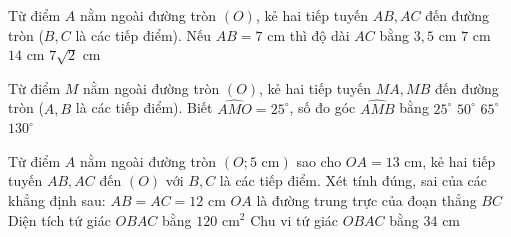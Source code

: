 
\begin{ex}%
	Từ điểm $A$ nằm ngoài đường tròn $(O)$, kẻ hai tiếp tuyến $AB, AC$ đến đường tròn ($B, C$ là các tiếp điểm). Nếu $AB = 7\text{ cm}$ thì độ dài $AC$ bằng
	\choice
	{$3{,}5\text{ cm}$}
	{\True $7\text{ cm}$}
	{$14\text{ cm}$}
	{$7\sqrt{2}\text{ cm}$}
\end{ex}

\begin{ex}%
	Từ điểm $M$ nằm ngoài đường tròn $(O)$, kẻ hai tiếp tuyến $MA, MB$ đến đường tròn ($A, B$ là các tiếp điểm). Biết $\widehat{AMO} = 25^\circ$, số đo góc $\widehat{AMB}$ bằng
	\choice
	{$25^\circ$}
	{\True $50^\circ$}
	{$65^\circ$}
	{$130^\circ$}
\end{ex}

\begin{ex}%
	Từ điểm $A$ nằm ngoài đường tròn $(O; 5\text{ cm})$ sao cho $OA = 13\text{ cm}$, kẻ hai tiếp tuyến $AB, AC$ đến $(O)$ với $B, C$ là các tiếp điểm. Xét tính đúng, sai của các khẳng định sau:
	\choiceTF
	{\True $AB = AC = 12\text{ cm}$}
	{\True $OA$ là đường trung trực của đoạn thẳng $BC$}
	{Diện tích tứ giác $OBAC$ bằng $120\text{ cm}^2$}
	{\True Chu vi tứ giác $OBAC$ bằng $34\text{ cm}$}
\end{ex}

